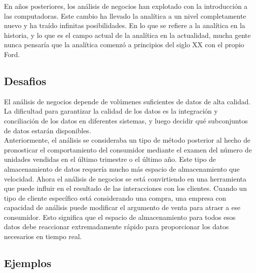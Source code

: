 \documentclass[preprint,12pt]{elsarticle}
\begin{document}
	En años posteriores, los análisis de negocios han explotado con la introducción a las computadoras. Este cambio ha llevado la analítica a un nivel completamente nuevo y ha traído infinitas posibilidades. En lo que se refiere a la analítica en la historia, y lo que es el campo actual de la analítica en la actualidad, mucha gente nunca pensaría que la analítica comenzó a principios del siglo XX con el propio Ford.
	
	\subsection{Desafios}
	El análisis de negocios depende de volúmenes suficientes de datos de alta calidad. La dificultad para garantizar la calidad de los datos es la integración y conciliación de los datos en diferentes sistemas, y luego decidir qué subconjuntos de datos estarán disponibles. \\
	
	Anteriormente, el análisis se consideraba un tipo de método posterior al hecho de pronosticar el comportamiento del consumidor mediante el examen del número de unidades vendidas en el último trimestre o el último año. Este tipo de almacenamiento de datos requería mucho más espacio de almacenamiento que velocidad. Ahora el análisis de negocios se está convirtiendo en una herramienta que puede influir en el resultado de las interacciones con los clientes. Cuando un tipo de cliente específico está considerando una compra, una empresa con capacidad de análisis puede modificar el argumento de venta para atraer a ese consumidor. Esto significa que el espacio de almacenamiento para todos esos datos debe reaccionar extremadamente rápido para proporcionar los datos necesarios en tiempo real.
	
	
	\newpage
	
	\subsection{Ejemplos \\}
		
\end{document}
